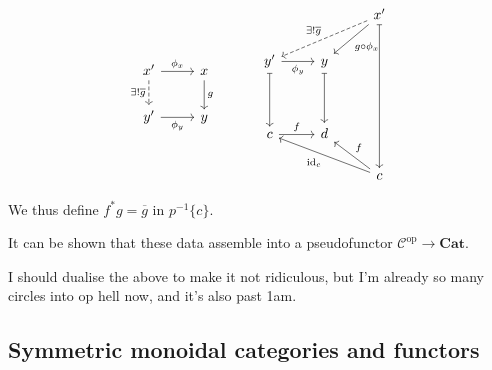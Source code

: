 \documentclass{MetricNotes2023}
\def\id{\ensuremath\text{id}}
\begin{document}
\[\begin{tikzcd}
x' \arrow[r, "\phi_x"] \arrow[d, swap, dashrightarrow, "\exists!\overline g"]  & x \arrow[d, "g"]  \\
y' \arrow[r, swap, "\phi_y"]  & y
\end{tikzcd}\quad\quad\quad \begin{tikzcd}
 & & x' \arrow[dddd, mapsto, ""] \arrow[dll, dashrightarrow, swap, "\exists !\overline g"] \arrow[dl, "g \circ \phi_x"] \\
y' \arrow[r, swap, "\phi_y"] \arrow[dd, mapsto, swap, ""] & y \arrow[dd, mapsto, swap, ""]  & \\
& & \\
c \arrow[r, "f"] & d  & \\
 & & c \arrow[llu, "\id_c"] \arrow[lu, swap, "f"] 
\end{tikzcd}\]

We thus define \(f^*g=\overline{g}\) in \(p^{-1}\{c\}\). 

It can be shown that these data assemble into a pseudofunctor \(\mathcal{C}^{\text{op}}\to \textbf{Cat}\).

I should dualise the above to make it not ridiculous, but I'm already so many circles into op hell now, and it's also past 1am. 

\subsection{Symmetric monoidal categories and functors}
\end{document}
